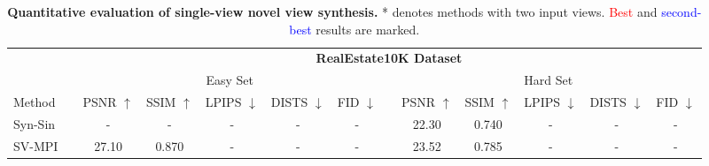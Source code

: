\begin{table*}[t]
\caption{\textbf{Quantitative evaluation of single-view novel view synthesis.} * denotes methods with two input views. \textcolor{red}{Best} and \textcolor{blue}{second-best} results are marked.}
\label{tab:main-singleview}
\setlength\tabcolsep{4pt}
\begin{tabular}{lcccccccccccc}
\toprule[0.15em]
                         & \multicolumn{1}{l}{} & \multicolumn{11}{c}{\textbf{RealEstate10K Dataset}}                                                                                                                                                                                                                                                                             \\ \cline{3-13} 
                         &                      & \multicolumn{5}{c}{Easy Set}                                                                                                                             &  & \multicolumn{5}{c}{Hard Set}                                                                                                                             \\ \cline{3-7} \cline{9-13} 
\multirow{-3}{*}{Method} &                      & PSNR $\uparrow$                         & SSIM $\uparrow$                         & LPIPS $\downarrow$                        & DISTS $\downarrow$                        & FID $\downarrow$                          &  & PSNR $\uparrow$                         & SSIM $\uparrow$                         & LPIPS $\downarrow$                        & DISTS $\downarrow$                        & FID $\downarrow$                          \\ \midrule[0.15em]
Syn-Sin                  &                      & -                            & -                            & -                            & -                            & -                            &  & 22.30                        & 0.740                        & -                            & -                            & -                            \\
SV-MPI                   &                      & 27.10                        & 0.870                        & -                            & -                            & -                            &  & 23.52                        & 0.785                        & -                            & -                            & -                            \\

\end{tabular}
\end{table*}
